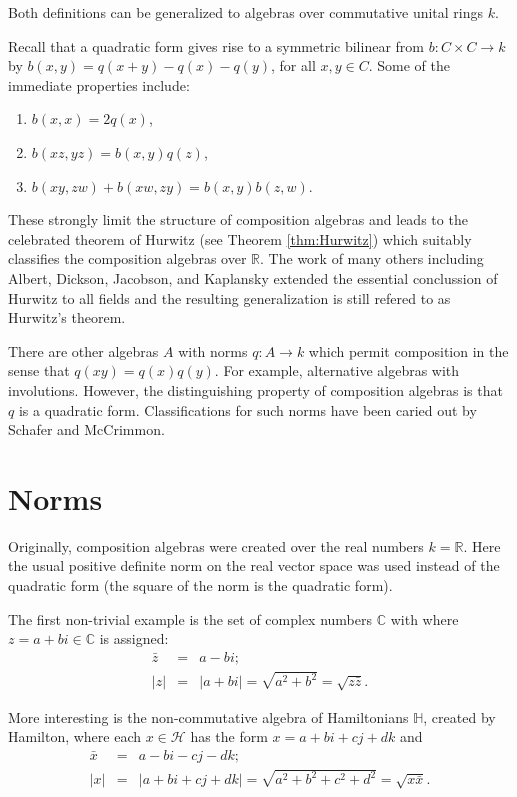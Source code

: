 \documentclass[12pt]{article}
\begin{document}
Both definitions can be generalized to algebras over commutative unital rings $k$.

Recall that a quadratic form gives rise to a symmetric bilinear from $b:C\times C\to k$ by
$b(x,y)=q(x+y)-q(x)-q(y)$, for all $x,y\in C$.  Some of the immediate properties include:
\begin{enumerate}
\item $b(x,x)=2q(x)$, 
\item $b(xz,yz)=b(x,y)q(z)$,
\item $b(xy,zw)+b(xw,zy)=b(x,y)b(z,w)$.
\end{enumerate}
These strongly limit the structure of composition algebras
and leads to the celebrated theorem of Hurwitz (see Theorem \ref{thm:Hurwitz}) 
which suitably classifies the composition algebras over $\mathbb{R}$.  The work of
many others including Albert, Dickson, Jacobson, and Kaplansky extended the essential
conclussion of Hurwitz to all fields and the resulting generalization is still
refered to as Hurwitz's theorem.

There are other algebras $A$ with norms $q:A\to k$ which permit composition
in the sense that $q(xy)=q(x)q(y)$.  For example, alternative algebras with involutions.
However, the distinguishing property of composition algebras is that $q$ is a quadratic form.
Classifications for such norms have been caried out by Schafer and McCrimmon.

\section{Norms}

Originally, composition algebras were created over the real numbers $k=\mathbb{R}$. 
Here the usual positive definite norm on the real vector space was used instead of 
the quadratic form (the square of the norm is the quadratic form).

The first non-trivial example is the set of complex numbers $\mathbb{C}$ with where
$z=a+bi\in\mathbb{C}$ is assigned:
\begin{eqnarray*} 
\bar{z} & =& a-bi;\\
|z| & = & |a+bi|=\sqrt{a^2+b^2}=\sqrt{z\bar{z}}.
\end{eqnarray*}

More interesting is the non-commutative algebra of Hamiltonians 
$\mathbb{H}$, created by Hamilton, where each $x\in\mathcal{H}$ has the form
$x=a+bi+cj+dk$ and
\begin{eqnarray*}
\bar{x} & = & a-bi-cj-dk;\\
|x| & = & |a+bi+cj+dk|=\sqrt{a^2+b^2+c^2+d^2}=\sqrt{x\bar{x}}.
\end{eqnarray*} 
\end{document}
